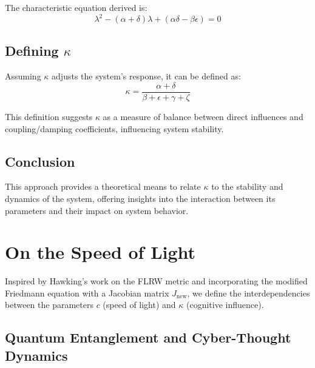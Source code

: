 \documentclass{article}
\begin{document}
The characteristic equation derived is:
\[
\lambda^2 - (\alpha + \delta)\lambda + (\alpha\delta - \beta\epsilon) = 0
\]

\subsection{Defining \( \kappa \)}
Assuming \( \kappa \) adjusts the system's response, it can be defined as:
\[
\kappa = \frac{\alpha + \delta}{\beta + \epsilon + \gamma + \zeta}
\]

This definition suggests \( \kappa \) as a measure of balance between direct influences and coupling/damping coefficients, influencing system stability.

\subsection{Conclusion}
This approach provides a theoretical means to relate \( \kappa \) to the stability and dynamics of the system, offering insights into the interaction between its parameters and their impact on system behavior.

\section*{On the Speed of Light}

Inspired by Hawking's work on the FLRW metric and incorporating the modified Friedmann equation with a Jacobian matrix \( J_{\text{new}} \), we define the interdependencies between the parameters \( c \) (speed of light) and \( \kappa \) (cognitive influence). 
\subsection*{Quantum Entanglement and Cyber-Thought Dynamics}
\end{document}
